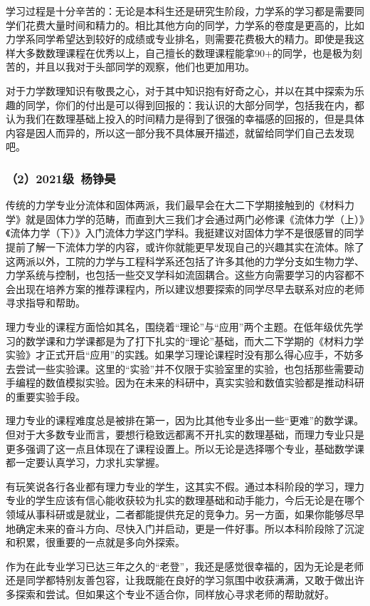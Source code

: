 \documentclass[11pt,oneside]{book}
\begin{document}
学习过程是十分辛苦的：无论是本科生还是研究生阶段，力学系的学习都是需要同学们花费大量时间和精力的。相比其他方向的同学，力学系的卷度是更高的，比如力学系同学希望达到较好的成绩或专业排名，则需要花费极大的精力。即使是我这样大多数数理课程在优秀以上，自己擅长的数理课程能拿90+的同学，也是极为刻苦的，并且以我对于头部同学的观察，他们也更加用功。

对于力学数理知识有敬畏之心，对于其中知识抱有好奇之心，并以在其中探索为乐趣的同学，你们的付出是可以得到回报的：我认识的大部分同学，包括我在内，都认为我们在数理基础上投入的时间精力是得到了很强的幸福感的回报的，但是具体内容是因人而异的，所以这一部分我不具体展开描述，就留给同学们自己去发现吧。

\subsubsection{（2）2021级\ 杨铮昊}

传统的力学专业分流体和固体两派，我们最早会在大二下学期接触到的《材料力学》就是固体力学的范畴，而直到大三我们才会通过两门必修课《流体力学（上）》《流体力学（下）》入门流体力学这门学科。我挺建议对固体力学不是很感冒的同学提前了解一下流体力学的内容，或许你就能更早发现自己的兴趣其实在流体。除了这两派以外，工院的力学与工程科学系还包括了许多其他的力学分支如生物力学、力学系统与控制，也包括一些交叉学科如流固耦合。这些方向需要学习的内容都不会出现在培养方案的推荐课程内，所以建议想要探索的同学尽早去联系对应的老师寻求指导和帮助。

理力专业的课程方面恰如其名，围绕着“理论”与“应用”两个主题。在低年级优先学习的数学课和力学课都是为了打下扎实的“理论”基础，而大二下学期的《材料力学实验》才正式开启“应用”的实践。如果学习理论课程时没有那么得心应手，不妨多去尝试一些实验课。这里的“实验”并不仅限于实验室里的实验，也包括那些需要动手编程的数值模拟实验。因为在未来的科研中，真实实验和数值实验都是推动科研的重要实验手段。

理力专业的课程难度总是被排在第一，因为比其他专业多出一些“更难”的数学课。但对于大多数专业而言，要想行稳致远都离不开扎实的数理基础，而理力专业只是更多强调了这一点且体现在了课程设置上。所以无论是选择哪个专业，基础数学课都一定要认真学习，力求扎实掌握。

有玩笑说各行各业都有理力专业的学生，这其实不假。通过本科阶段的学习，理力专业的学生应该有信心能收获较为扎实的数理基础和动手能力，今后无论是在哪个领域从事科研或是就业，二者都能提供充足的竞争力。另一方面，如果你能够尽早地确定未来的奋斗方向、尽快入门并启动，更是一件好事。所以本科阶段除了沉淀和积累，很重要的一点就是多向外探索。

作为在此专业学习已达三年之久的“老登”，我还是感觉很幸福的，因为无论是老师还是同学都特别友善包容，让我既能在良好的学习氛围中收获满满，又敢于做出许多探索和尝试。但如果这个专业不适合你，同样放心寻求老师的帮助就好。
\end{document}
